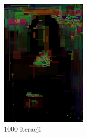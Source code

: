 \begin{figure}[!htb]
\begin{subfigure}[b]{0.3\textwidth}
         \includegraphics[width=\textwidth]{images/mona/10000_300_2/img_0_it_1000_best.png}
         \caption{1000 iteracji}
    \end{subfigure}
    \begin{subfigure}[b]{0.3\textwidth}
        \centering

\end{subfigure}
\end{figure}
